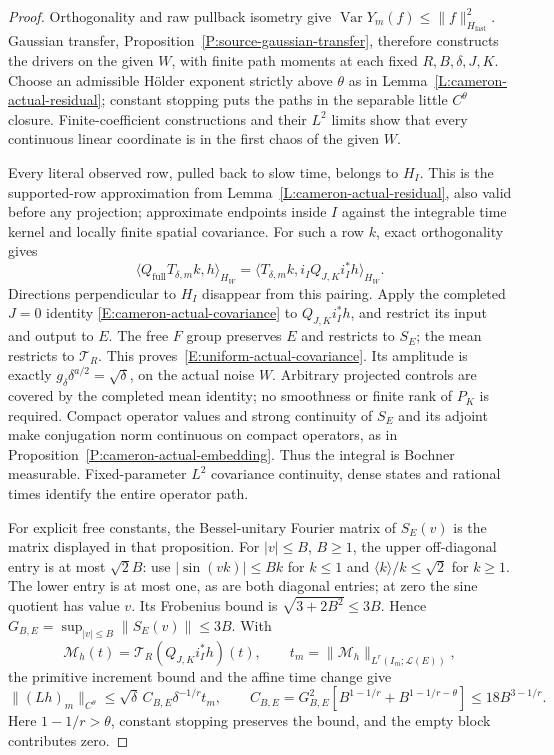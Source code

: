 \begin{proof}
  Orthogonality and raw pullback isometry give
  $\operatorname{Var}Y_m(f)\le\|f\|_{H_{\mathrm{fast}}}^2$.
  Gaussian transfer, Proposition~\ref{P:source-gaussian-transfer},
  therefore constructs the drivers on the given $W$, with finite
  path moments at each fixed $R,B,\delta,J,K$.
  Choose an admissible H\"older exponent strictly above $\theta$
  as in Lemma~\ref{L:cameron-actual-residual}; constant stopping
  puts the paths in the separable little $C^\theta$ closure.
  Finite-coefficient constructions and their $L^2$ limits show
  that every continuous linear coordinate is in the first chaos
  of the given $W$.

  Every literal observed row, pulled back to slow time, belongs
  to $H_I$. This is the supported-row approximation from
  Lemma~\ref{L:cameron-actual-residual}, also valid before any
  projection; approximate endpoints inside $I$ against the
  integrable time kernel and locally finite spatial covariance.
  For such a row $k$, exact orthogonality gives
  \[
    \langle Q_{\mathrm{full}}T_{\delta,m}k,h\rangle_{H_W}
    =\langle T_{\delta,m}k,i_IQ_{J,K}i_I^*h\rangle_{H_W}.
  \]
  Directions perpendicular to $H_I$ disappear from this pairing.
  Apply the completed $J=0$ identity
  \eqref{E:cameron-actual-covariance} to $Q_{J,K}i_I^*h$,
  and restrict its input and output to $E$.
  The free $F$ group preserves $E$ and restricts to $S_E$;
  the mean restricts to $\mathcal T_R$.
  This proves~\eqref{E:uniform-actual-covariance}.
  Its amplitude is exactly
  $g_\delta\delta^{a/2}=\sqrt\delta$, on the actual noise $W$.
  Arbitrary projected controls are covered by the completed mean
  identity; no smoothness or finite rank of $P_K$ is required.
  Compact operator values and strong continuity of $S_E$ and
  its adjoint make conjugation norm continuous on compact operators,
  as in Proposition~\ref{P:cameron-actual-embedding}.
  Thus the integral is Bochner measurable.
  Fixed-parameter $L^2$ covariance continuity, dense states and
  rational times identify the entire operator path.

  For explicit free constants, the Bessel-unitary Fourier matrix
  of $S_E(v)$ is the matrix displayed in that proposition.
  For $|v|\le B$, $B\ge1$, the upper off-diagonal entry is at most
  $\sqrt2 B$: use $|\sin(vk)|\le Bk$ for $k\le1$ and
  $\langle k\rangle/k\le\sqrt2$ for $k\ge1$.
  The lower entry is at most one, as are both diagonal entries;
  at zero the sine quotient has value $v$.
  Its Frobenius bound is $\sqrt{3+2B^2}\le3B$.
  Hence $G_{B,E}=\sup_{|v|\le B}\|S_E(v)\|\le3B$.
  With
  \[
    \mathcal M_h(t)=\mathcal T_R(Q_{J,K}i_I^*h)(t),\qquad
    t_m=\|\mathcal M_h\|_{L^r(I_m;\mathcal L(E))},
  \]
  the primitive increment bound and the affine time change give
  \[
    \|(Lh)_m\|_{C^\theta}
    \le\sqrt\delta\,C_{B,E}\delta^{-1/r}t_m,\qquad
    C_{B,E}=G_{B,E}^2[B^{1-1/r}+B^{1-1/r-\theta}]
    \le18B^{3-1/r}.
  \]
  Here $1-1/r>\theta$, constant stopping preserves the bound,
  and the empty block contributes zero.


\end{proof}
